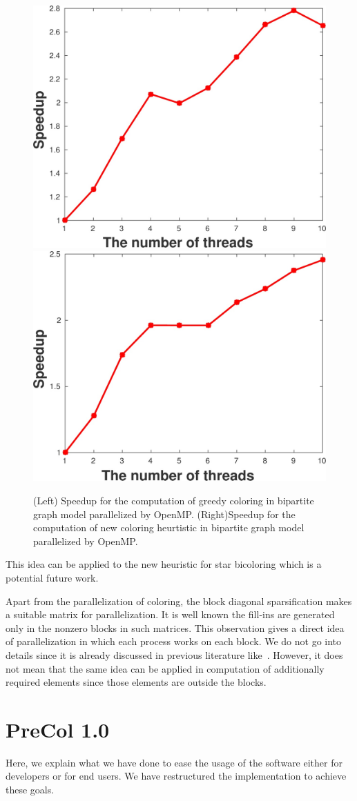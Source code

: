 \documentclass[12pt, oneside]{book}
\begin{document}
\begin{figure}
\includegraphics[width=0.44\linewidth]{ths_spd.jpg}\hfill
\includegraphics[width=0.47\linewidth]{ths_spd2.jpg}
\caption{
(Left) Speedup for the computation of greedy coloring in bipartite graph model parallelized by OpenMP.
(Right)Speedup for the computation of new coloring heurtistic in bipartite graph model parallelized by OpenMP.
}
\label{speedups}
\end{figure}
This idea can be applied to the new heuristic for star bicoloring which is a potential future work.

Apart from the parallelization of coloring, the block diagonal sparsification makes a suitable
matrix for parallelization. It is well known the fill-ins are generated only in the nonzero blocks in such matrices. This observation gives a direct idea of parallelization in which each process
works on each block. We do not go into details since it is already discussed in previous literature like~\cite{parblockilu}. However, it does not mean that the same idea can be applied in computation of
additionally required elements since those elements are outside the blocks.


\section{PreCol 1.0}%
\label{s.extend}
Here, we explain what we have done to ease the usage of the software
either for developers or for end users. We have restructured the implementation
to achieve these goals. 
\end{document}
